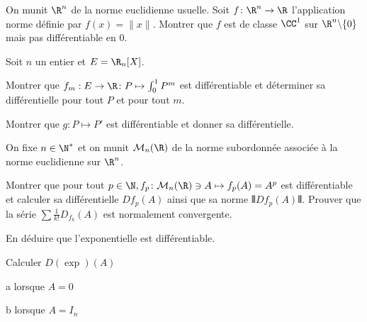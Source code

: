 \documentclass{report}
\begin{document}
\begin{exo}
    On munit \(\R^n\) de la norme euclidienne usuelle. Soit \(f\colon\R^n\to\R\)
    l'application norme définie par \(f(x)=\|x\|\). Montrer que \(f\)
    est de classe \(\CC^1\) sur \(\R^n\backslash\{0\}\) mais pas différentiable en 0.
\end{exo}

\begin{exo}
    Soit \(n\) un entier et \(E=\R_n[X]\).
    \begin{q}{1}
        Montrer que \(f_m:E\to\R\colon P\mapsto \int_0^1 P^m\) est différentiable
        et déterminer sa différentielle pour tout \(P\) et pour tout \(m\).
    \end{q}
    \begin{q}{2}
        Montrer que \(g\colon P\mapsto P'\) est différentiable et donner sa différentielle.
    \end{q}
\end{exo}

\begin{exo}
    On fixe \(n\in\N^*\) et on munit \(\mathcal{M}_n(\R)\) de la norme subordonnée
    associée à la norme euclidienne sur \(\R^n\).
    \begin{q}{1}
        Montrer que pour tout \(p\in\N, f_p\colon \mathcal{M}_n(\R)\ni
        A\mapsto f_p(A)=A^p\) est différentiable et calculer sa différentielle
        \(Df_p(A)\) ainsi que sa norme \(\Vvert Df_p(A)\Vvert\). Prouver que
        la série \(\sum \frac{1}{k!}D_{f_k}(A)\) est normalement convergente.
    \end{q}
    \begin{q}{2}
        En déduire que l'exponentielle est différentiable.
    \end{q}
    \begin{q}{3}
        Calculer \(D(\exp)(A)\)
        \begin{q}{a}
            lorsque \(A=0\)
        \end{q}
        \begin{q}{b}
            lorsque \(A=I_n\)
        \end{q}
    \end{q}
\end{exo}
\end{document}
